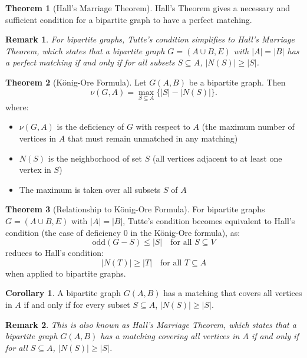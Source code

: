 \documentclass{article}
\newtheorem{remark}{Remark}
\theoremstyle{definition}
\newtheorem{theorem}{Theorem}
\newtheorem{corollary}{Corollary}
\begin{document}
\begin{theorem}[Hall's Marriage Theorem]
Hall's Theorem gives a necessary and sufficient condition for a bipartite graph to have a perfect matching.
\end{theorem}

\begin{remark}
For bipartite graphs, Tutte's condition simplifies to Hall's Marriage Theorem, which states that a bipartite graph $G = (A \cup B, E)$ with $|A| = |B|$ has a perfect matching if and only if for all subsets $S \subseteq A$, $|N(S)| \geq |S|$.
\end{remark}

\begin{theorem}[König-Ore Formula]
Let $G(A, B)$ be a bipartite graph. Then
\[
\nu(G, A) = \max_{S \subseteq A} \{|S| - |N(S)|\}.
\]
where:
\begin{itemize}
    \item $\nu(G, A)$ is the deficiency of $G$ with respect to $A$ (the maximum number of vertices in $A$ that must remain unmatched in any matching)
    \item $N(S)$ is the neighborhood of set $S$ (all vertices adjacent to at least one vertex in $S$)
    \item The maximum is taken over all subsets $S$ of $A$
\end{itemize}
\end{theorem}

\begin{theorem}[Relationship to König-Ore Formula]
For bipartite graphs $G = (A \cup B, E)$ with $|A| = |B|$, Tutte's condition becomes equivalent to Hall's condition (the case of deficiency $0$ in the König-Ore formula), as:
\[
\text{odd}(G - S) \leq |S| \quad \text{for all } S \subseteq V
\]
reduces to Hall's condition:
\[
|N(T)| \geq |T| \quad \text{for all } T \subseteq A
\]
when applied to bipartite graphs.
\end{theorem}

\begin{corollary}
A bipartite graph $G(A, B)$ has a matching that covers all vertices in $A$ if and only if for every subset $S \subseteq A$, $|N(S)| \geq |S|$.
\end{corollary}

\begin{remark}
This is also known as Hall's Marriage Theorem, which states that a bipartite graph $G(A, B)$ has a matching covering all vertices in $A$ if and only if for all $S \subseteq A$, $|N(S)| \geq |S|$.
\end{remark}
\end{document}
